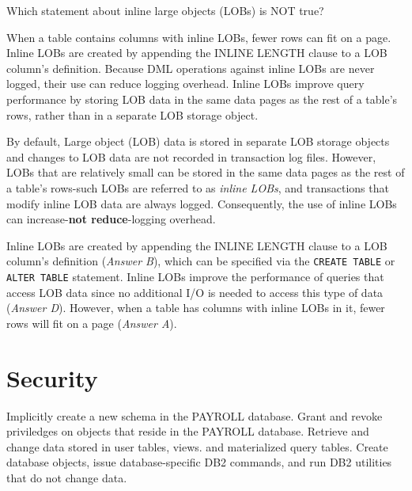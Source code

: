 \documentclass[answers, 11pt]{exam}
\begin{document}
\begin{questions}
\begin{solution}
\end{solution}

\question[1]
Which statement about inline large objects (LOBs) is NOT true?
\begin{choices} 
\choice When a table contains columns with inline LOBs, fewer rows can fit on a page.
\choice Inline LOBs are created by appending the INLINE LENGTH clause to a LOB column's definition.
\CorrectChoice Because DML operations against inline LOBs are never logged, their use can reduce logging overhead.
\choice Inline LOBs improve query performance by storing LOB data in the same data pages as the rest of a
table's rows, rather than in a separate LOB storage object.
\end{choices}

\begin{solution}
By default, Large object (LOB) data is stored in separate LOB storage objects and changes to LOB data
are not recorded in transaction log files. However, LOBs that are relatively small can be stored in the
same data pages as the rest of a table's rows-such LOBs are referred to as \textit{inline LOBs}, and
transactions that modify inline LOB data are always logged. Consequently, the use of inline LOBs can
increase-\textbf{not reduce}-logging overhead.
\par

Inline LOBs are created by appending the INLINE LENGTH clause to a LOB column's definition (\textit{Answer B}), which can be specified via the \texttt{CREATE TABLE} or \texttt{ALTER TABLE} statement. Inline LOBs
improve the performance of queries that access LOB data since no additional I/O is needed to access
this type of data (\textit{Answer D}). However, when a table has columns with inline LOBs in it,
fewer rows will fit on a page (\textit{Answer A}).

\end{solution}

\newpage
\addpoints
\section{Security}
\begin{choices}
	\choice Implicitly create a new schema in the PAYROLL database.
	\choice Grant and revoke priviledges on objects that reside in the PAYROLL database.
	\CorrectChoice Retrieve and change data stored in user tables, views. and materialized query tables.
	\choice Create database objects, issue database-specific DB2 commands, and run DB2 utilities that 
	do not change data.
\end{choices}


\end{questions}
\end{document}
